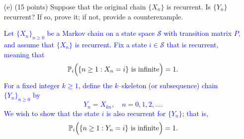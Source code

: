 \documentclass{article}
\begin{document}
\begin{enumerate}
        
        \item[(e)] (15 points) Suppose that the original chain $\{X_n\}$ is recurrent. Is $\{Y_n\}$ recurrent? If so, prove it; if not, provide a counterexample.

%
\textcolor{blue}{Let $\{X_n\}_{n\ge 0}$ be a Markov chain on a state space $\mathcal{S}$ with transition matrix $P$, and assume that $\{X_n\}$ is recurrent. Fix a state $i\in\mathcal{S}$ that is recurrent, meaning that
\[
\mathbb{P}_i\Bigl(\{n\ge 1 : X_n = i\} \text{ is infinite}\Bigr)=1.
\]
For a fixed integer $k\ge 1$, define the $k$--skeleton (or subsequence) chain $\{Y_n\}_{n\ge 0}$ by
\[
Y_n=X_{kn},\quad n=0,1,2,\dots.
\]
We wish to show that the state $i$ is also recurrent for $\{Y_n\}$; that is,
\[
\mathbb{P}_i\Bigl(\{n\ge 1 : Y_n=i\} \text{ is infinite}\Bigr)=1.
\]}
\end{enumerate}
\end{document}
